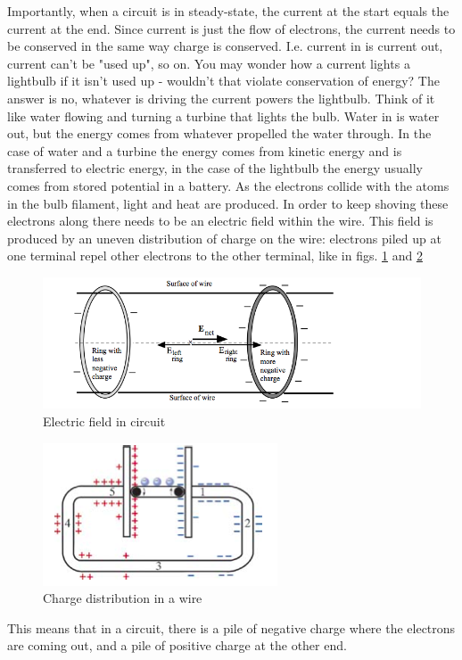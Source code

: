 \documentclass[nobib]{tufte-handout}
\begin{document}
Importantly, when a circuit is in steady-state, the current at the start equals the current 
at the end. 
Since current is just the flow of electrons, the current needs to be conserved
in the same way charge is conserved. I.e. current in is current out, current can't be "used up",
so on. You may wonder how a current lights a lightbulb if it isn't used up - wouldn't that violate 
conservation of energy? The answer is no, whatever is driving the current powers the lightbulb. Think 
of it like water flowing and turning a turbine that lights the bulb. Water in is water out, but the energy
comes from whatever propelled the water through. In the case of water and a turbine the energy comes from 
kinetic energy and is transferred to electric energy, in the case of the lightbulb the energy usually 
comes from stored potential in a battery. As the electrons collide with the atoms in the bulb filament, 
light and heat are produced. In order to keep shoving these electrons along there needs to be an electric 
field within the wire. This field is produced by an uneven distribution of charge on the wire: electrons 
piled up at one terminal repel other electrons to the other terminal, like in figs. \ref{fig:ringsofpower}
and \ref{fig:chargedistr}
\begin{figure}
    \center
    \caption{Electric field in circuit}
    \label{fig:ringsofpower}
    \includegraphics{images/bfucc.png}
\end{figure}
\begin{figure}
    \center
    \caption{Charge distribution in a wire}
    \label{fig:chargedistr}
    \includegraphics{images/L5thM.png}
\end{figure}
This means that in a circuit, there is a pile of negative charge where the electrons are coming out,
and a pile of positive charge at the other end. 
\end{document}
